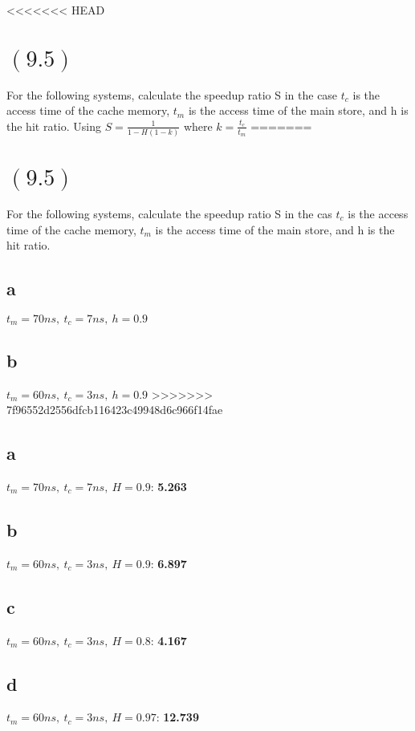 \documentclass[letterpaper,12pt,titlepage]{article}
\begin{document}
<<<<<<< HEAD
\newpage
\section*{$(9.5)$} For the following systems, calculate the speedup ratio S in the case $t_c$ is the access time of the cache memory, $t_m$ is the access time of the main store, and h is the hit ratio. Using $S=\frac{1}{1-H(1-k)}$ where $k=\frac{t_c}{t_m}$
=======
\section*{$(9.5)$} For the following systems, calculate the speedup ratio S in the cas $t_c$ is the access time of the cache memory, $t_m$ is the access time of the main store, and h is the hit ratio.

\subsection*{a} $t_m=70ns,~t_c=7ns,~h=0.9$
\begin{mdframed}[style=MyFrame]
\end{mdframed}
\subsection*{b} $t_m=60ns,~t_c=3ns,~h=0.9$
>>>>>>> 7f96552d2556dfcb116423c49948d6c966f14fae
\begin{mdframed}[style=MyFrame]
\subsection*{a} $t_m=70ns,~t_c=7ns,~H=0.9$: \textbf{5.263}
\subsection*{b} $t_m=60ns,~t_c=3ns,~H=0.9$: \textbf{6.897}
\subsection*{c} $t_m=60ns,~t_c=3ns,~H=0.8$: \textbf{4.167}
\subsection*{d} $t_m=60ns,~t_c=3ns,~H=0.97$: \textbf{12.739}
\end{mdframed}
\end{document}
